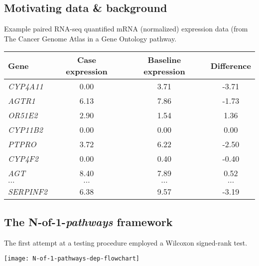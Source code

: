 \documentclass[a0,portrait]{a0poster}
\begin{document}
\begin{multicols}{3}
\subsection{Motivating data \& background}

Example paired RNA-seq quantified mRNA (normalized) expression data (from The Cancer Genome Atlas\cite{weinstein2013cancer} in a Gene Ontology\cite{Ashburner2000} pathway.

\begin{tabular}{l|ccc}
\hline
Gene & Case expression & Baseline expression & Difference\\
\hline
  \emph{CYP4A11}   & 0.00  & 3.71  & -3.71 \\
  \emph{AGTR1}     & 6.13  & 7.86  & -1.73 \\
  \emph{OR51E2}    & 2.90  & 1.54  & 1.36 \\
  \emph{CYP11B2}   & 0.00  & 0.00  & \phantom{-}0.00 \\
  \emph{PTPRO}     & 3.72  & 6.22  & -2.50 \\
  \emph{CYP4F2}    & 0.00  & 0.40  & -0.40 \\
  \emph{AGT}       & 8.40  & 7.89  & \phantom{-}0.52 \\
  \emph{$\ldots$}       & $\ldots$  & $\ldots$  & $\ldots$ \\
  \emph{SERPINF2}  & 6.38  & 9.57  & -3.19 \\
\hline
\end{tabular}


\color{Black} %
\subsection{The N-of-1-{\itshape pathways} framework}

The first attempt at a testing procedure employed a Wilcoxon signed-rank test\cite{Gardeux2014}.

\begin{center}\vspace{1cm}
\texttt{[image: N-of-1-pathways-dep-flowchart]}
\end{center}%


\end{multicols}
\end{document}
